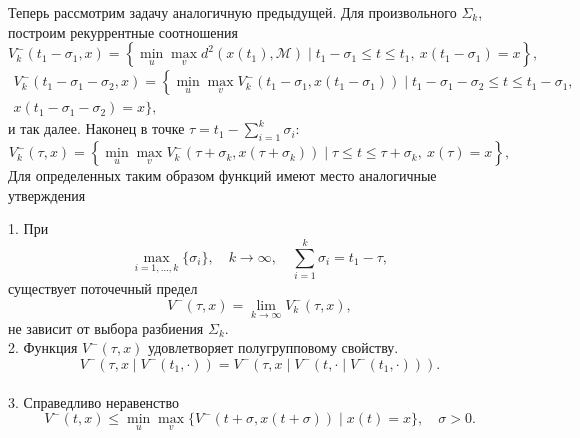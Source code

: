 Теперь рассмотрим задачу аналогичную предыдущей. Для произвольного \( \Sigma_k \), построим
 рекуррентные соотношения 
\begin{equation*}
    V_k^-(t_1 - \sigma_1, x) = \left\{ \min_u \max_v  d^2(x(t_1), \mathcal{M}) \mid t_1 -
     \sigma_1 \le t \le t_1, \ x(t_1 - \sigma_1) = x \right\},
\end{equation*}
\begin{multline*} 
    V_k^-(t_1 - \sigma_1 - \sigma_2, x) = \left\{ \min_u \max_v  V_k^-(t_1 - \sigma_1, x(t_1 -
     \sigma_1)) \mid t_1 - \sigma_1 - \sigma_2 \le t \le t_1 - \sigma_1, \right. \\ 
    x(t_1 - \sigma_1 - \sigma_2) = x \Big\},
\end{multline*}
и так далее. Наконец в точке \( \tau = t_1 - \sum\limits_{i = 1}^k \sigma_i \):
\begin{equation*}
    V_k^-(\tau, x) = \left\{ \min_u \max_v  V_k^- (\tau + \sigma_k, x(\tau + \sigma_k)) \mid
     \tau \le t \le \tau + \sigma_k, \ x(\tau) = x \right\},
\end{equation*}
Для определенных таким образом функций имеют место аналогичные утверждения
\begin{lemma}
    1. При
    \[ 
        \max_{i = 1,\dots,k} \{\sigma_i\}, \quad k \to \infty, \quad \sum_{i = 1}^k \sigma_i = 
         t_1 - \tau, 
    \]
    существует поточечный предел
    \[
        V^-(\tau, x) = \lim_{k \to \infty} V_k^-(\tau, x),
    \]
    не зависит от выбора разбиения \( \Sigma_k \). \\
    2. Функция \( V^-(\tau, x) \) удовлетворяет полугрупповому свойству.
    \begin{equation}
        V^-(\tau, x \mid V^-(t_1, \cdot)) = V^-(\tau, x \mid V^-(t, \cdot \mid V^-(t_1, \cdot))).
    \end{equation} \\
    3. Справедливо неравенство
    \begin{equation}
        V^-(t,x) \le \min_u \max_v \{ V^-(t + \sigma, x(t + \sigma)) \mid x(t) = x \}, 
         \quad \sigma > 0.
    \end{equation}
\end{lemma}

